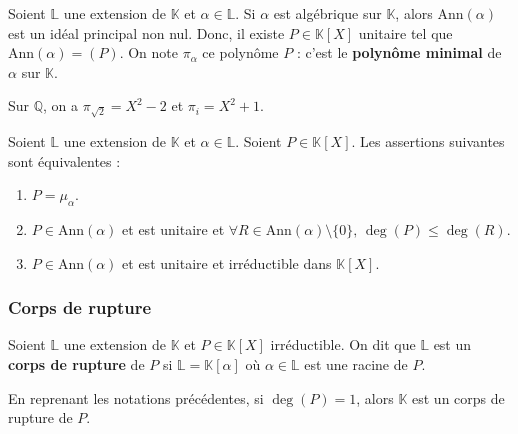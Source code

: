   \begin{definition}
    Soient $\mathbb{L}$ une extension de $\mathbb{K}$ et $\alpha \in \mathbb{L}$. Si $\alpha$ est algébrique sur $\mathbb{K}$, alors $\mathrm{Ann}(\alpha)$ est un idéal principal non nul. Donc, il existe $P \in \mathbb{K}[X]$ unitaire tel que $\mathrm{Ann}(\alpha) = (P)$. On note $\pi_\alpha$ ce polynôme $P$ : c'est le \textbf{polynôme minimal} de $\alpha$ sur $\mathbb{K}$.
  \end{definition}

  \begin{example}
    Sur $\mathbb{Q}$, on a $\pi_{\sqrt{2}} = X^2 - 2$ et $\pi_i = X^2 + 1$.
  \end{example}


  \begin{proposition}
    Soient $\mathbb{L}$ une extension de $\mathbb{K}$ et $\alpha \in \mathbb{L}$. Soient $P \in \mathbb{K}[X]$. Les assertions suivantes sont équivalentes :
    \begin{enumerate}[label={\bfseries(\roman*)}]
      \item $P = \mu_\alpha$.
      \item $P \in \mathrm{Ann}(\alpha)$ et est unitaire et $\forall R \in \mathrm{Ann}(\alpha) \setminus \{ 0 \}, \, \deg(P) \leq \deg(R)$.
      \item $P \in \mathrm{Ann}(\alpha)$ et est unitaire et irréductible dans $\mathbb{K}[X]$.
    \end{enumerate}
  \end{proposition}

  \subsubsection{Corps de rupture}


  \begin{definition}
    Soient $\mathbb{L}$ une extension de $\mathbb{K}$ et $P \in \mathbb{K}[X]$ irréductible. On dit que $\mathbb{L}$ est un \textbf{corps de rupture} de $P$ si $\mathbb{L} = \mathbb{K}[\alpha]$ où $\alpha \in \mathbb{L}$ est une racine de $P$.
  \end{definition}

  \begin{example}
    En reprenant les notations précédentes, si $\deg(P) = 1$, alors $\mathbb{K}$ est un corps de rupture de $P$.
  \end{example}


